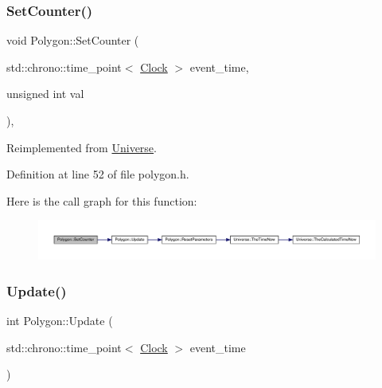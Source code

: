 \mbox{\label{class_polygon_ad12083d8c152a1979b04bead93b6b730}} 
\subsubsection{\texorpdfstring{Set\+Counter()}{SetCounter()}\hspace{0.1cm}{\footnotesize\ttfamily [2/2]}}
{\footnotesize\ttfamily void Polygon\+::\+Set\+Counter (\begin{DoxyParamCaption}\item[{std\+::chrono\+::time\+\_\+point$<$ \hyperlink{universe_8h_a0ef8d951d1ca5ab3cfaf7ab4c7a6fd80}{Clock} $>$}]{event\+\_\+time,  }\item[{unsigned int}]{val }\end{DoxyParamCaption})\hspace{0.3cm}{\ttfamily [inline]}, {\ttfamily [virtual]}}



Reimplemented from \hyperlink{class_universe_aa22202ae740eb1355529afcb13285e91}{Universe}.



Definition at line 52 of file polygon.\+h.

Here is the call graph for this function\+:
\nopagebreak
\begin{figure}[H]
\begin{center}
\leavevmode
\includegraphics[width=350pt]{class_polygon_ad12083d8c152a1979b04bead93b6b730_cgraph}
\end{center}
\end{figure}
\mbox{\label{class_polygon_ab3fe58d8ffce2e16589958def88aa188}} 
\subsubsection{\texorpdfstring{Update()}{Update()}}
{\footnotesize\ttfamily int Polygon\+::\+Update (\begin{DoxyParamCaption}\item[{std\+::chrono\+::time\+\_\+point$<$ \hyperlink{universe_8h_a0ef8d951d1ca5ab3cfaf7ab4c7a6fd80}{Clock} $>$}]{event\+\_\+time }\end{DoxyParamCaption})}



